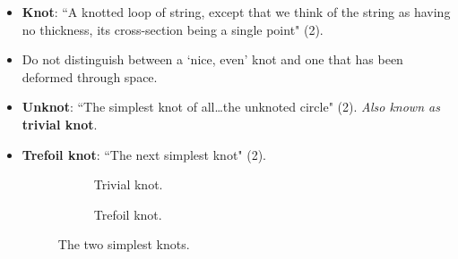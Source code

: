 \documentclass[titlepage]{article}
\newcommand{\dq}[2]{``#1" (#2).}
\begin{document}
\begin{itemize}
    \item \textbf{Knot}: \dq{A knotted loop of string, except that we think of the string as having no thickness, its cross-section being a single point}{2}
    \item Do not distinguish between a `nice, even' knot and one that has been deformed through space.
    \item \textbf{Unknot}: \dq{The simplest knot of all\dots the unknoted circle}{2} \emph{Also known as} \textbf{trivial knot}.
    \item \textbf{Trefoil knot}: \dq{The next simplest knot}{2}
    \begin{figure}[h!]
        \centering
        \begin{subfigure}{0.4\linewidth}
            \centering
            \caption{Trivial knot.}
            \label{fig:circletrefoila}
        \end{subfigure}
        \begin{subfigure}{0.4\linewidth}
            \centering
            \caption{Trefoil knot.}
            \label{fig:circletrefoilb}
        \end{subfigure}
        \caption{The two simplest knots.}
        \label{fig:circletrefoil}
    \end{figure}
\end{itemize}
\end{document}
